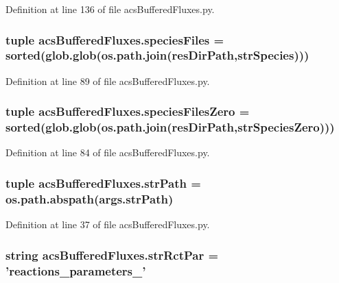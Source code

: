 Definition at line 136 of file acs\-Buffered\-Fluxes.\-py.

\hypertarget{a00092_ae41c9dafcdeb581e70eeb889d16c6551}{
\subsubsection[{species\-Files}]{\setlength{\rightskip}{0pt plus 5cm}tuple acs\-Buffered\-Fluxes.\-species\-Files = sorted(glob.\-glob(os.\-path.\-join({\bf res\-Dir\-Path},{\bf str\-Species})))}}\label{a00092_ae41c9dafcdeb581e70eeb889d16c6551}


Definition at line 89 of file acs\-Buffered\-Fluxes.\-py.

\hypertarget{a00092_a8c18127c32adcc1a3403749a047270e5}{
\subsubsection[{species\-Files\-Zero}]{\setlength{\rightskip}{0pt plus 5cm}tuple acs\-Buffered\-Fluxes.\-species\-Files\-Zero = sorted(glob.\-glob(os.\-path.\-join({\bf res\-Dir\-Path},{\bf str\-Species\-Zero})))}}\label{a00092_a8c18127c32adcc1a3403749a047270e5}


Definition at line 84 of file acs\-Buffered\-Fluxes.\-py.

\hypertarget{a00092_a8932cabcf73065a531104c53a324508a}{
\subsubsection[{str\-Path}]{\setlength{\rightskip}{0pt plus 5cm}tuple acs\-Buffered\-Fluxes.\-str\-Path = os.\-path.\-abspath(args.\-str\-Path)}}\label{a00092_a8932cabcf73065a531104c53a324508a}


Definition at line 37 of file acs\-Buffered\-Fluxes.\-py.

\hypertarget{a00092_ac571c8d78a216f58ebc1e37bef25a541}{
\subsubsection[{str\-Rct\-Par}]{\setlength{\rightskip}{0pt plus 5cm}string acs\-Buffered\-Fluxes.\-str\-Rct\-Par = 'reactions\-\_\-parameters\-\_\-'}}\label{a00092_ac571c8d78a216f58ebc1e37bef25a541}



